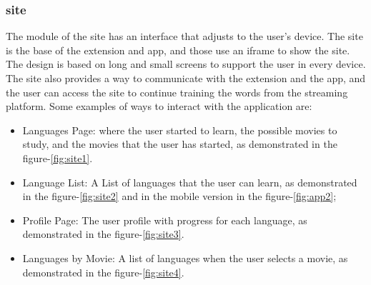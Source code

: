 \documentclass[12pt]{article}
\begin{document}
\subsubsection{site}
The module of the site has an interface that adjusts to the user's device. The site is the base of the extension and app, and those use an iframe to show the site. The design is based on long and small screens to support the user in every device. The site also provides a way to communicate with the extension and the app, and the user can access the site to continue training the words from the streaming platform. Some examples of ways to interact with the application are:
\begin{itemize}
\item   Languages Page: where the user started to learn, the possible movies to study, and the movies that the user has started, as demonstrated in the figure-\ref{fig:site1}.
\item Language List: A List of languages that the user can learn, as demonstrated in the figure-\ref{fig:site2} and in the mobile version in the figure-\ref{fig:app2};
\item Profile Page: The user profile with progress for each language, as demonstrated in the figure-\ref{fig:site3}.
\item Languages by Movie: A list of languages when the user selects a movie, as demonstrated in the figure-\ref{fig:site4}.
\end{itemize}
\end{document}
